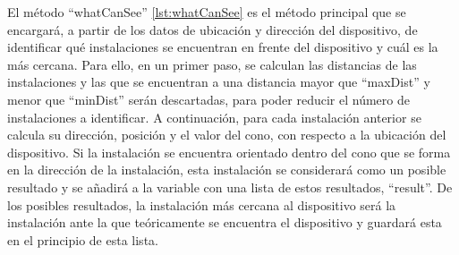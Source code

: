 El método ``whatCanSee'' \ref{lst:whatCanSee} es el método principal que se encargará, a partir de los datos de ubicación y dirección del dispositivo, de identificar qué instalaciones se encuentran en frente del dispositivo y cuál es la más cercana. Para ello, en un primer paso, se calculan las distancias de las  instalaciones y las que se encuentran a una distancia mayor que ``maxDist'' y menor que ``minDist'' serán descartadas, para poder reducir el número de instalaciones a identificar. A continuación, para cada instalación anterior se calcula su dirección, posición y el valor del cono, con respecto a la ubicación del dispositivo. Si la instalación se encuentra orientado dentro del cono que se forma en la dirección de la instalación, esta instalación se considerará como un posible resultado y se añadirá a la variable con una lista de estos resultados, ``result''. De los posibles resultados, la instalación más cercana al dispositivo será la instalación ante la que teóricamente se encuentra el dispositivo y guardará esta en el principio de esta lista.
 
